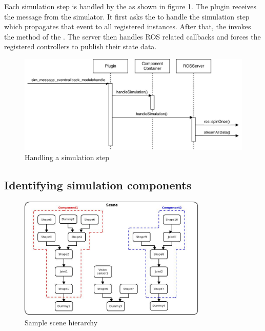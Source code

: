 Each simulation step is handled by the  as shown in figure \ref{fig:handle_sim}. The plugin receives the  message from the simulator. It first asks the  to handle the simulation step which propagates that event to all registered  instances. After that, the  invokes the  method of the . The server then handles ROS related callbacks and forces the registered controllers to publish their state data.

\begin{figure}[ht]
	\centering
  	\includegraphics[width=1.0\textwidth]{images/handle_sim.jpg}
	\caption{Handling a simulation step}
	\label{fig:handle_sim}
\end{figure}

\subsection{Identifying simulation components}
\label{sec:comp_id}

\begin{figure}[h]
	\centering
  	\includegraphics[width=0.8\textwidth]{images/scene_hierarchy.jpg}
	\caption{Sample scene hierarchy}
	\label{fig:scene_tree}
\end{figure}

